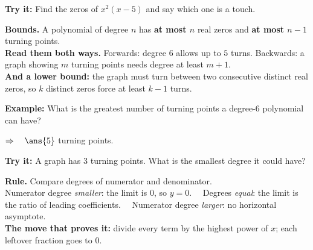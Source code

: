 \documentclass[12pt]{article}
\begin{document}
\begin{tryitbox}
\textbf{Try it:} \quad Find the zeros of $x^{2}(x - 5)$ and say which one is
a touch.\\[2pt]
\end{tryitbox}


\begin{formulabox}
\textbf{Bounds.} A polynomial of degree $n$ has \textbf{at most $n$} real
zeros and \textbf{at most $n - 1$} turning points.\\[3pt]
\textbf{Read them both ways.} Forwards: degree $6$ allows up to $5$ turns.
Backwards: a graph showing $m$ turning points needs degree at least
$m + 1$.\\[3pt]
\textbf{And a lower bound:} the graph must turn between two consecutive
distinct real zeros, so $k$ distinct zeros force at least $k - 1$ turns.
\end{formulabox}

\begin{examplebox}
\textbf{Example:} \quad What is the greatest number of turning points a
degree-$6$ polynomial can have?

$\Rightarrow\quad \ans{5}$ turning points.
\end{examplebox}

\begin{tryitbox}
\textbf{Try it:} \quad A graph has $3$ turning points. What is the smallest
degree it could have?\\[2pt]
\end{tryitbox}


\begin{formulabox}
\textbf{Rule.} Compare degrees of numerator and denominator.\\[3pt]
Numerator degree \emph{smaller}: the limit is $0$, so $y = 0$. \ \ Degrees
\emph{equal}: the limit is the ratio of leading coefficients. \ \ Numerator
degree \emph{larger}: no horizontal asymptote.\\[3pt]
\textbf{The move that proves it:} divide every term by the highest power of
$x$; each leftover fraction goes to $0$.
\end{formulabox}
\end{document}
